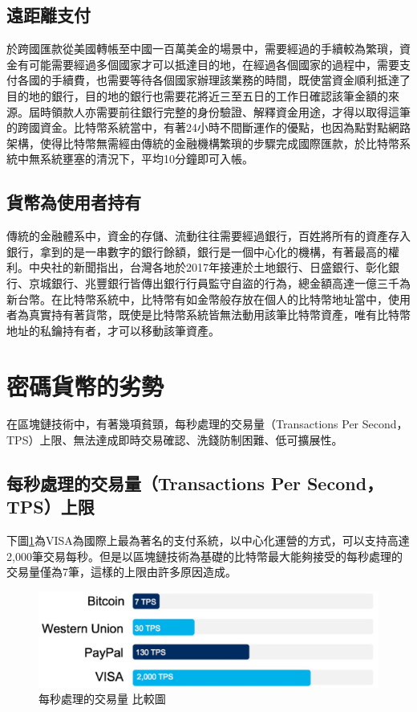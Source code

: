 		\subsection{遠距離支付}
		於跨國匯款從美國轉帳至中國一百萬美金的場景中，需要經過的手續較為繁瑣，資金有可能需要經過多個國家才可以抵達目的地，在經過各個國家的過程中，需要支付各國的手續費，也需要等待各個國家辦理該業務的時間，既使當資金順利抵達了目的地的銀行，目的地的銀行也需要花將近三至五日的工作日確認該筆金額的來源。屆時領款人亦需要前往銀行完整的身份驗證、解釋資金用途，才得以取得這筆的跨國資金。比特幣系統當中，有著24小時不間斷運作的優點，也因為點對點網路架構，使得比特幣無需經由傳統的金融機構繁瑣的步驟完成國際匯款，於比特幣系統中無系統壅塞的清況下，平均10分鐘即可入帳。

		\subsection{貨幣為使用者持有}
		傳統的金融體系中，資金的存儲、流動往往需要經過銀行，百姓將所有的資產存入銀行，拿到的是一串數字的銀行餘額，銀行是一個中心化的機構，有著最高的權利。中央社的新聞\parencite{Bankguardsstolen}指出，台灣各地於2017年接連於土地銀行、日盛銀行、彰化銀行、京城銀行、兆豐銀行皆傳出銀行行員監守自盜的行為，總金額高達一億三千為新台幣。在比特幣系統中，比特幣有如金幣般存放在個人的比特幣地址當中，使用者為真實持有著貨幣，既使是比特幣系統皆無法動用該筆比特幣資產，唯有比特幣地址的私鑰持有者，才可以移動該筆資產。

	\section{密碼貨幣的劣勢}
	在區塊鏈技術中，有著幾項貧頸，每秒處理的交易量（Transactions Per Second，TPS）上限、無法達成即時交易確認、洗錢防制困難、低可擴展性。
		\subsection{每秒處理的交易量（Transactions Per Second，TPS）上限}
		下圖\ref{TPS}為VISA為國際上最為著名的支付系統，以中心化運營的方式，可以支持高達2,000筆交易每秒。但是以區塊鏈技術為基礎的比特幣最大能夠接受的每秒處理的交易量僅為7筆，這樣的上限由許多原因造成。

		\begin{figure}[h]
			\centering
			\includegraphics[width = .7\textwidth]{TPS.png}
			\caption{每秒處理的交易量 比較圖\parencite{TPS}}\label{TPS}
		\end{figure}


